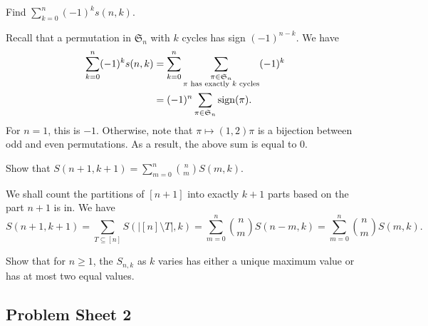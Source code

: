 		\begin{problem}
			Find $\sum_{k=0}^n (-1)^k s(n,k)$.
		\end{problem}
		\begin{solution*}
			Recall that a permutation in $\mathfrak{S}_n$ with $k$ cycles has sign $(-1)^{n-k}$. We have
			\begin{align*}
				\sum_{k=0}^n (-1)^k s(n,k) &= \sum_{k=0}^n \sum_{\substack{\pi \in \mathfrak{S}_n \\ \text{$\pi$ has exactly $k$ cycles}}} (-1)^k \\
					&= (-1)^n \sum_{\pi \in \mathfrak{S}_n} \operatorname{sign}(\pi).
			\end{align*}
			For $n=1$, this is $-1$. Otherwise, note that $\pi \mapsto (1,2) \pi$ is a bijection between odd and even permutations. As a result, the above sum is equal to $0$.
		\end{solution*}

		\begin{problem}
			Show that $S(n+1,k+1) = \sum_{m=0}^n \binom{n}{m} S(m,k)$.
		\end{problem}
		\begin{solution*}
			We shall count the partitions of $[n+1]$ into exactly $k+1$ parts based on the part $n+1$ is in. We have
			\[ S(n+1,k+1) = \sum_{T \subseteq [n]} S(|[n]\setminus T|,k) = \sum_{m=0}^n \binom{n}{m} S(n-m,k) = \sum_{m=0}^n \binom{n}{m} S(m,k). \]
		\end{solution*}


		\begin{problem}
			Show that for $n \ge 1$, the $S_{n,k}$ as $k$ varies has either a unique maximum value or has at most two equal values.
		\end{problem}
		\begin{solution*}
			
		\end{solution*}

	\subsection{Problem Sheet 2}

